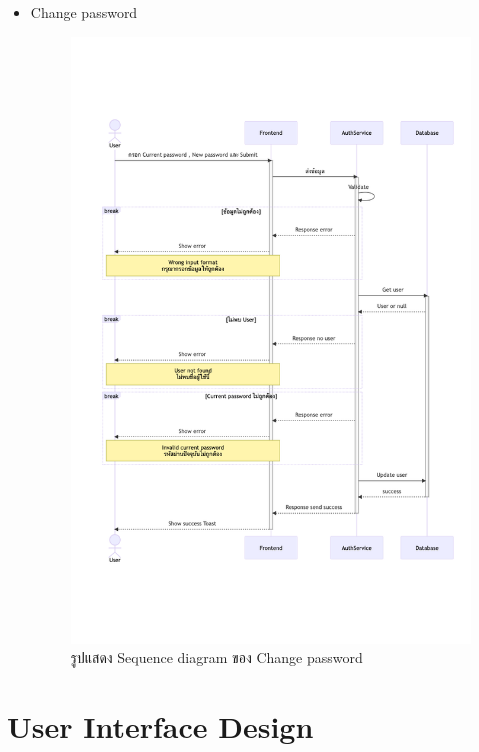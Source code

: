 \documentclass[12pt,oneside,openright,a4paper]{cpe-thai-project}
\begin{document}
\begin{itemize}
        
    \newpage
    \item  Change password\\
    \begin{figure}[!ht]\centering
        \includegraphics[width=13cm, trim={0 5cm 0 5cm},clip]{./assets/sequence-diagram/change-password.png}
        \caption{รูปแสดง Sequence diagram ของ Change password}\label{fig:sqChangePassword}
    \end{figure}

    
\end{itemize}
\newpage
\section{User Interface Design}
\end{document}
